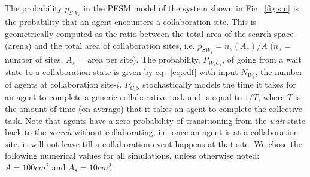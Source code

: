 \documentclass{svmult}  %
\begin{document}
The probability $p_{SW_i}$ in the PFSM model of the system shown in Fig.~\ref{fig:sm} is the probability that an agent encounters a collaboration site. This is geometrically computed as the ratio between the total area of the search space (arena) and the total area of collaboration sites, i.e. $p_{SW_i} = n_s(A_s)/A$ ($n_s$ = number of sites, $A_s$ = area per site). The probability, $P_{W_iC_i}$, of going from a wait state to a collaboration state is given by eq.~\eqref{eq:cdf} with input $N_{W_i}$, the number of agents at collaboration site-$i$. $P_{C_iS}$ stochastically models the time it takes for an agent to complete a generic collaborative task and is equal to $1/T$, where $T$ is the amount of time (on average) that it takes an agent to complete the collective task. Note that agents have a zero probability of transitioning from the \emph{wait} state back to the \emph{search} without collaborating, i.e. once an agent is at a collaboration site, it will not leave till a collaboration event happens at that site. We chose the following numerical values for all simulations, unless otherwise noted: $A=100cm^2$ and $A_s=10cm^2$.
\end{document}
